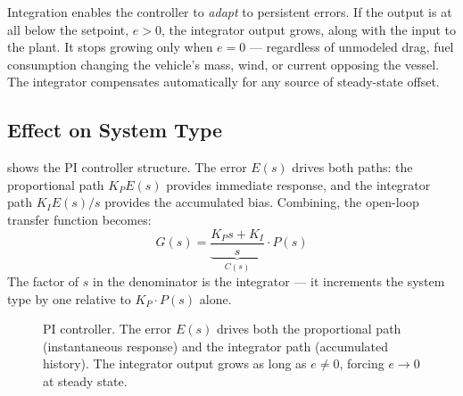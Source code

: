 \documentclass[12pt]{article}
\begin{document}
Integration enables the controller to \emph{adapt} to persistent errors.  If the output is at all below the
setpoint, $e > 0$, the integrator output grows, along with the input to the plant.
It stops growing only when $e = 0$ --- regardless of unmodeled drag, fuel
consumption changing the vehicle's mass, wind, or current opposing the vessel.
The integrator compensates automatically for any source of steady-state offset.


\subsection{Effect on System Type}

 shows the PI controller structure.  The error $E(s)$
drives both paths: the proportional path $K_P E(s)$ provides immediate response,
and the integrator path $K_I E(s)/s$ provides the accumulated bias.
Combining, the open-loop transfer function becomes:
\[
  G(s) = \underbrace{\frac{K_P s + K_I}{s}}_{C(s)}\cdot P(s)
\]
The factor of $s$ in the denominator is the integrator --- it increments the
system type by one relative to $K_P\cdot P(s)$ alone.

\begin{figure}[htbp]
\centering
{}
\caption{PI controller.  The error $E(s)$ drives both the proportional path
  (instantaneous response) and the integrator path (accumulated history).
  The integrator output grows as long as $e \ne 0$, forcing $e \to 0$ at
  steady state.}
\label{fig:pi_structure}
\end{figure}
\end{document}
